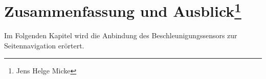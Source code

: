 \chapter[Zusammenfassung und Ausblick]{Zusammenfassung und Ausblick\footnote{Jens Helge Micke}}
\thispagestyle{fancy}
\label{Ausblick}
Im Folgenden Kapitel wird die Anbindung des Beschleunigungssensors zur Seitennavigation erörtert.